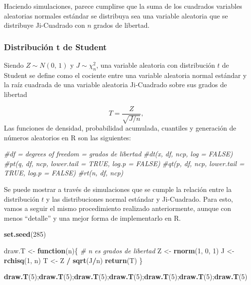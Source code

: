 \documentclass[]{article}
\newenvironment{Shaded}{\begin{snugshade}}{\end{snugshade}}
\newcommand{\CommentTok}[1]{\textcolor[rgb]{0.56,0.35,0.01}{\textit{#1}}}
\newcommand{\ControlFlowTok}[1]{\textcolor[rgb]{0.13,0.29,0.53}{\textbf{#1}}}
\newcommand{\DecValTok}[1]{\textcolor[rgb]{0.00,0.00,0.81}{#1}}
\newcommand{\KeywordTok}[1]{\textcolor[rgb]{0.13,0.29,0.53}{\textbf{#1}}}
\newcommand{\NormalTok}[1]{#1}
\newcommand{\OperatorTok}[1]{\textcolor[rgb]{0.81,0.36,0.00}{\textbf{#1}}}
\newcommand{\StringTok}[1]{\textcolor[rgb]{0.31,0.60,0.02}{#1}}
\begin{document}
Haciendo simulaciones, parece cumplirse que la suma de los cuadrados
variables aleatorias normales estándar se distribuya sea una variable
aleatoria que se distribuye Ji-Cuadrado con \(n\) grados de libertad.

\hypertarget{distribucion-t-de-student}{%
\subsubsection{Distribución t de
Student}\label{distribucion-t-de-student}}

Siendo \(Z \sim N(0,\,1)\) y \(J \sim \chi^2_n\), una variable aleatoria
con distribución \(t\) de Student se define como el cociente entre una
variable aleatoria normal estándar y la raíz cuadrada de una variable
aleatoria Ji-Cuadrado sobre sus grados de libertad

\[T = \frac{Z}{\sqrt{J/n}},\] Las funciones de densidad, probabilidad
acumulada, cuantiles y generación de números aleatorios en R son las
siguientes:

\begin{Shaded}
\begin{Highlighting}[]
\CommentTok{#df = degrees of freedom = grados de libertad}
\CommentTok{#dt(x, df, ncp, log = FALSE)}
\CommentTok{#pt(q, df, ncp, lower.tail = TRUE, log.p = FALSE)}
\CommentTok{#qt(p, df, ncp, lower.tail = TRUE, log.p = FALSE)}
\CommentTok{#rt(n, df, ncp)}
\end{Highlighting}
\end{Shaded}

Se puede mostrar a través de simulaciones que se cumple la relación
entre la distribución \(t\) y las distribuciones normal estándar y
Ji-Cuadrado. Para esto, vamos a seguir el mismo procedimiento realizado
anteriormente, aunque con menos ``detalle'' y una mejor forma de
implementarlo en R.

\begin{Shaded}
\begin{Highlighting}[]
\KeywordTok{set.seed}\NormalTok{(}\DecValTok{285}\NormalTok{)}

\NormalTok{draw.T <-}\StringTok{ }\ControlFlowTok{function}\NormalTok{(n)\{}
  \CommentTok{# n es grados de libertad}
\NormalTok{  Z <-}\StringTok{ }\KeywordTok{rnorm}\NormalTok{(}\DecValTok{1}\NormalTok{, }\DecValTok{0}\NormalTok{, }\DecValTok{1}\NormalTok{)}
\NormalTok{  J <-}\StringTok{ }\KeywordTok{rchisq}\NormalTok{(}\DecValTok{1}\NormalTok{, n)}
\NormalTok{  T <-}\StringTok{ }\NormalTok{Z }\OperatorTok{/}\StringTok{ }\KeywordTok{sqrt}\NormalTok{(J}\OperatorTok{/}\NormalTok{n)}
  \KeywordTok{return}\NormalTok{(T)}
\NormalTok{\}}

\KeywordTok{draw.T}\NormalTok{(}\DecValTok{5}\NormalTok{);}\KeywordTok{draw.T}\NormalTok{(}\DecValTok{5}\NormalTok{);}\KeywordTok{draw.T}\NormalTok{(}\DecValTok{5}\NormalTok{);}\KeywordTok{draw.T}\NormalTok{(}\DecValTok{5}\NormalTok{);}\KeywordTok{draw.T}\NormalTok{(}\DecValTok{5}\NormalTok{);}\KeywordTok{draw.T}\NormalTok{(}\DecValTok{5}\NormalTok{);}\KeywordTok{draw.T}\NormalTok{(}\DecValTok{5}\NormalTok{)}
\end{Highlighting}
\end{Shaded}
\end{document}
